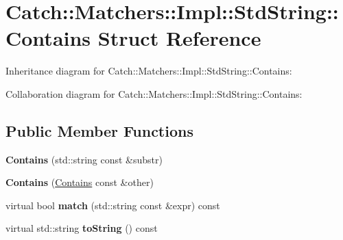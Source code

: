 \hypertarget{struct_catch_1_1_matchers_1_1_impl_1_1_std_string_1_1_contains}{}\section{Catch\+:\+:Matchers\+:\+:Impl\+:\+:Std\+String\+:\+:Contains Struct Reference}
\label{struct_catch_1_1_matchers_1_1_impl_1_1_std_string_1_1_contains}


Inheritance diagram for Catch\+:\+:Matchers\+:\+:Impl\+:\+:Std\+String\+:\+:Contains\+:


Collaboration diagram for Catch\+:\+:Matchers\+:\+:Impl\+:\+:Std\+String\+:\+:Contains\+:
\subsection*{Public Member Functions}
\begin{DoxyCompactItemize}
\item 
\hypertarget{struct_catch_1_1_matchers_1_1_impl_1_1_std_string_1_1_contains_ac6f13133724bfd5796e8ee4ea8f2c0e3}{}{\bfseries Contains} (std\+::string const \&substr)\label{struct_catch_1_1_matchers_1_1_impl_1_1_std_string_1_1_contains_ac6f13133724bfd5796e8ee4ea8f2c0e3}

\item 
\hypertarget{struct_catch_1_1_matchers_1_1_impl_1_1_std_string_1_1_contains_ad6b1ef653dfcb3bab43c43be043dc4e8}{}{\bfseries Contains} (\hyperlink{struct_catch_1_1_matchers_1_1_impl_1_1_std_string_1_1_contains}{Contains} const \&other)\label{struct_catch_1_1_matchers_1_1_impl_1_1_std_string_1_1_contains_ad6b1ef653dfcb3bab43c43be043dc4e8}

\item 
\hypertarget{struct_catch_1_1_matchers_1_1_impl_1_1_std_string_1_1_contains_aa27d823dea5770025a24424fc3355a6f}{}virtual bool {\bfseries match} (std\+::string const \&expr) const \label{struct_catch_1_1_matchers_1_1_impl_1_1_std_string_1_1_contains_aa27d823dea5770025a24424fc3355a6f}

\item 
\hypertarget{struct_catch_1_1_matchers_1_1_impl_1_1_std_string_1_1_contains_a226755351f3598179925f3ab89d6def7}{}virtual std\+::string {\bfseries to\+String} () const \label{struct_catch_1_1_matchers_1_1_impl_1_1_std_string_1_1_contains_a226755351f3598179925f3ab89d6def7}

\end{DoxyCompactItemize}

